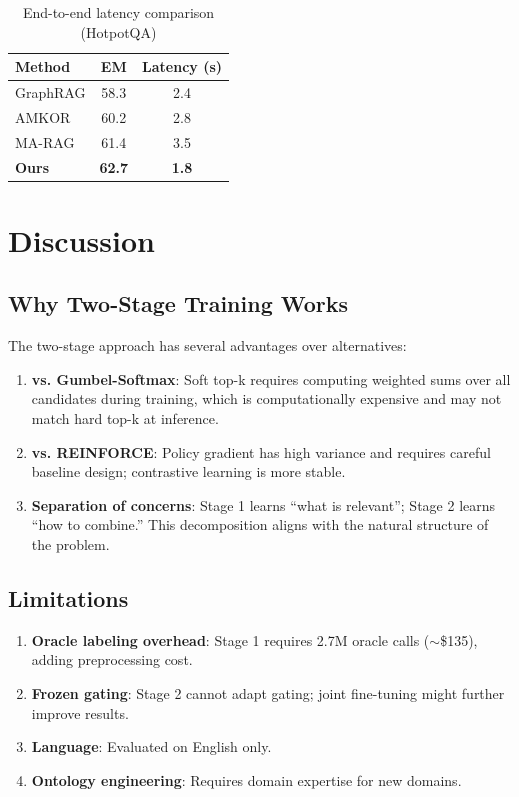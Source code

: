 \documentclass[10pt,twocolumn]{article}
\begin{document}
\begin{table}[h]
\centering
\caption{End-to-end latency comparison (HotpotQA)}
\label{tab:latency}
\small
\begin{tabular}{@{}lcc@{}}
\toprule
\textbf{Method} & \textbf{EM} & \textbf{Latency (s)} \\
\midrule
GraphRAG & 58.3 & 2.4 \\
AMKOR & 60.2 & 2.8 \\
MA-RAG & 61.4 & 3.5 \\
\midrule
\textbf{Ours} & \textbf{62.7} & \textbf{1.8} \\
\bottomrule
\end{tabular}
\end{table}


\section{Discussion}

\subsection{Why Two-Stage Training Works}

The two-stage approach has several advantages over alternatives:

\begin{enumerate}
    \item \textbf{vs. Gumbel-Softmax}: Soft top-k requires computing weighted sums over all candidates during training, which is computationally expensive and may not match hard top-k at inference.
    \item \textbf{vs. REINFORCE}: Policy gradient has high variance and requires careful baseline design; contrastive learning is more stable.
    \item \textbf{Separation of concerns}: Stage 1 learns ``what is relevant''; Stage 2 learns ``how to combine.'' This decomposition aligns with the natural structure of the problem.
\end{enumerate}

\subsection{Limitations}

\begin{enumerate}
    \item \textbf{Oracle labeling overhead}: Stage 1 requires 2.7M oracle calls ($\sim$\$135), adding preprocessing cost.
    \item \textbf{Frozen gating}: Stage 2 cannot adapt gating; joint fine-tuning might further improve results.
    \item \textbf{Language}: Evaluated on English only.
    \item \textbf{Ontology engineering}: Requires domain expertise for new domains.
\end{enumerate}
\end{document}
